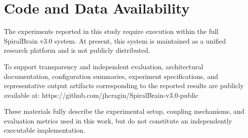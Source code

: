 \documentclass[12pt,a4paper]{article}
\begin{document}
\section{Code and Data Availability}

The experiments reported in this study require execution within the full SpiralBrain v3.0 system. At present, this system is maintained as a unified research platform and is not publicly distributed.

To support transparency and independent evaluation, architectural documentation, configuration summaries, experiment specifications, and representative output artifacts corresponding to the reported results are publicly available at:
https://github.com/jhcragin/SpiralBrain-v3.0-public

These materials fully describe the experimental setup, coupling mechanisms, and evaluation metrics used in this work, but do not constitute an independently executable implementation.



\end{document}
